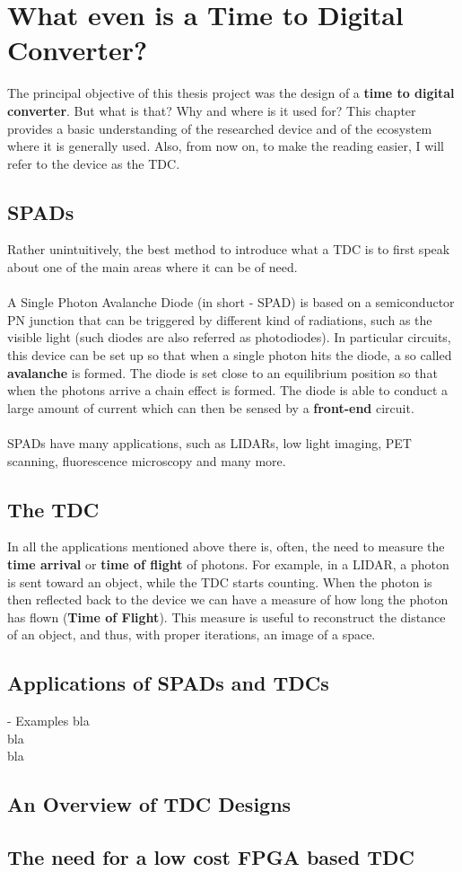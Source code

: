 \chapter{What even is a Time to Digital Converter?}
\label{cha:tdc-intro}
The principal objective of this thesis project was the design of a \textbf{time to digital converter}. But what is that? Why and where is it used for? This chapter provides a basic understanding of the researched device and of the ecosystem where it is generally used. Also, from now on, to make the reading easier, I will refer to the device as the TDC.
 



\section{SPADs}
\label{sec:tdc-spads}
Rather unintuitively, the best method to introduce what a TDC is to first speak about one of the main areas where it can be of need. \\ \\
A Single Photon Avalanche Diode (in short - SPAD) is based on a semiconductor PN junction that can be triggered by different kind of radiations, such as the visible light (such diodes are also referred as photodiodes). In particular circuits, this device can be set up so that when a single photon hits the diode, a so called \textbf{avalanche} is formed. The diode is set close to an equilibrium position so that when the photons arrive a chain effect is formed. The diode is able to conduct a large amount of current which can then be sensed by a \textbf{front-end} circuit.
\\ \\
SPADs have many applications, such as LIDARs, low light imaging, PET scanning, fluorescence microscopy and many more.


\section{The TDC}
\label{sec:tdc-introduction}
In all the applications mentioned above there is, often, the need to measure the \textbf{time arrival} or \textbf{time of flight} of photons. For example, in a LIDAR, a photon is sent toward an object, while the TDC starts counting. When the photon is then reflected back to the device we can have a measure of how long the photon has flown (\textbf{Time of Flight}). This measure is useful to reconstruct the distance of an object, and thus, with proper iterations, an image of a space.



\section{Applications of SPADs and TDCs}
\label{sec:tdc-examples}
- Examples
bla \\ bla \\ bla

\section{An Overview of TDC Designs}

\section{The need for a low cost FPGA based TDC}



